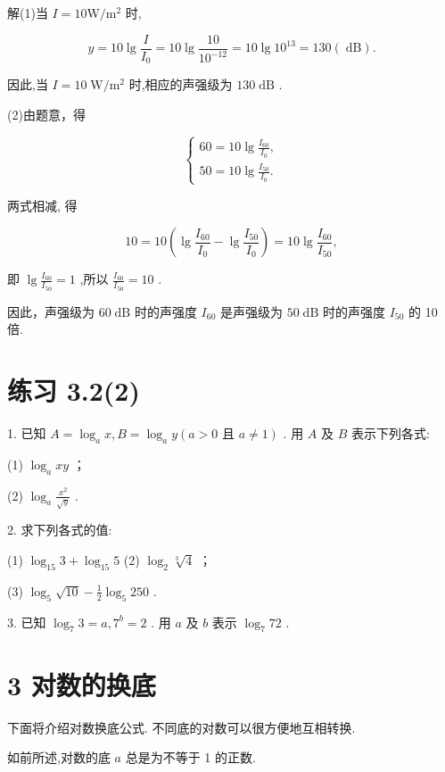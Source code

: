 \documentclass[10pt]{article}
\begin{document}
解(1)当 \(I = {10}\mathrm{W}/{\mathrm{m}}^{2}\) 时,

\[
y = {10}\lg \frac{I}{{I}_{0}} = {10}\lg \frac{10}{{10}^{-{12}}} = {10}\lg {10}^{13} = {130}\left( \mathrm{\;{dB}}\right) .
\]

因此,当 \(I = {10}\mathrm{\;W}/{\mathrm{m}}^{2}\) 时,相应的声强级为 \({130}\mathrm{\;{dB}}\) .

(2)由题意，得

\[
\left\{  \begin{array}{l} {60} = {10}\lg \frac{{I}_{60}}{{I}_{0}}, \\  {50} = {10}\lg \frac{{I}_{50}}{{I}_{0}}. \end{array}\right.
\]

两式相减, 得

\[
{10} = {10}\left( {\lg \frac{{I}_{60}}{{I}_{0}} - \lg \frac{{I}_{50}}{{I}_{0}}}\right)  = {10}\lg \frac{{I}_{60}}{{I}_{50}},
\]

即 \(\lg \frac{{I}_{60}}{{I}_{50}} = 1\) ,所以 \(\frac{{I}_{60}}{{I}_{50}} = {10}\) .

因此，声强级为 \({60}\mathrm{\;{dB}}\) 时的声强度 \({I}_{60}\) 是声强级为 \({50}\mathrm{\;{dB}}\) 时的声强度 \({I}_{50}\) 的 10 倍.



\section*{练习 3.2(2)}

1. 已知 \(A = {\log }_{a}x,B = {\log }_{a}y\left( {a > 0\text{ 且 }a \neq  1}\right)\) . 用 \(A\) 及 \(B\) 表示下列各式:

(1) \({\log }_{a}{xy}\) ；

(2) \({\log }_{a}\frac{{x}^{2}}{\sqrt{y}}\) .

2. 求下列各式的值:

(1) \({\log }_{15}3 + {\log }_{15}5\) (2) \({\log }_{2}\sqrt[3]{4}\) ；

(3) \({\log }_{5}\sqrt{10} - \frac{1}{2}{\log }_{5}{250}\) .

3. 已知 \({\log }_{7}3 = a,{7}^{b} = 2\) . 用 \(a\) 及 \(b\) 表示 \({\log }_{7}{72}\) .

\section*{3 对数的换底}

下面将介绍对数换底公式. 不同底的对数可以很方便地互相转换.

如前所述,对数的底 \(a\) 总是为不等于 1 的正数.
\end{document}
